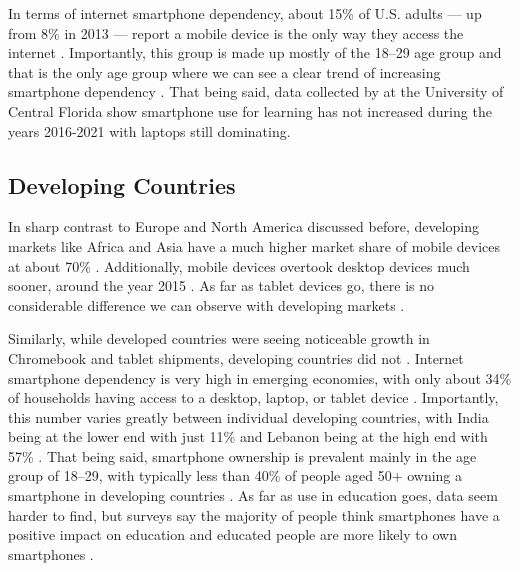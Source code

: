 In terms of internet smartphone dependency, about 15\% of U.S. adults --- up from 8\% in 2013 --- report a mobile device is the only way they access the internet \parencite{Pew_Research_2021}.
Importantly, this group is made up mostly of the 18--29 age group and that is the only age group where we can see a clear trend of increasing smartphone dependency \parencite{Pew_Research_2021}.
That being said, data collected by \textcite{Educause_2022} at the University of Central Florida show smartphone use for learning has not increased during the years 2016-2021 with laptops still dominating.

\subsection{Developing Countries}

In sharp contrast to Europe and North America discussed before, developing markets like Africa and Asia have a much higher market share of mobile devices at about 70\% \parencites{StatCounter_Africa_2023}{StatCounter_Asia_2023}.
Additionally, mobile devices overtook desktop devices much sooner, around the year 2015 \parencites{StatCounter_Africa_2023}{StatCounter_Asia_2023}.
As far as tablet devices go, there is no considerable difference we can observe with developing markets \parencites{StatCounter_Africa_2023}{StatCounter_Asia_2023}.

Similarly, while developed countries were seeing noticeable growth in Chromebook and tablet shipments, developing countries did not \parencite{Boreham_2019}.
Internet smartphone dependency is very high in emerging economies, with only about 34\% of households having access to a desktop, laptop, or tablet device \parencite{Pew_Research_2019}.
Importantly, this number varies greatly between individual developing countries, with India being at the lower end with just 11\% and Lebanon being at the high end with 57\% \parencite{Pew_Research_2019}.
That being said, smartphone ownership is prevalent mainly in the age group of 18--29, with typically less than 40\% of people aged 50+ owning a smartphone in developing countries \parencite{Pew_Research_2019}.
As far as use in education goes, data seem harder to find, but surveys say the majority of people think smartphones have a positive impact on education and educated people are more likely to own smartphones \parencite{Pew_Research_2019}.
